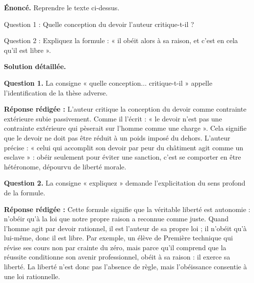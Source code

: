 \documentclass[11pt]{article}
\newcommand{\cle}[1]{{\popxbold\color{popdark}#1}}
\newcounter{popsec}
\newcounter{popsub}
\newcommand{\courssub}[1]{%
  \stepcounter{popsub}%
  \par\vspace{9pt}\noindent{\popxbold\fontsize{11.5}{13}\selectfont\color{popink}{\color{poporange}\thepopsec.\thepopsub}\hspace{6pt}#1}\par\nopagebreak\vspace{4pt}
}
\begin{document}
\begin{exoresolu}
\textbf{Énoncé.} Reprendre le texte ci-dessus.

Question 1 : Quelle conception du devoir l'auteur critique-t-il ?

Question 2 : Expliquez la formule : « il obéit alors à sa raison, et c'est en cela qu'il est libre ».

\tcblower
\textbf{Solution détaillée.}

\textbf{Question 1.} La consigne « quelle conception... critique-t-il » appelle l'identification de la thèse adverse.

\textbf{Réponse rédigée :} L'auteur critique la conception du devoir comme \cle{contrainte extérieure} subie passivement. Comme il l'écrit : « le devoir n'est pas une contrainte extérieure qui pèserait sur l'homme comme une charge ». Cela signifie que le devoir ne doit pas être réduit à un poids imposé du dehors. L'auteur précise : « celui qui accomplit son devoir par peur du châtiment agit comme un esclave » : obéir seulement pour éviter une sanction, c'est se comporter en être hétéronome, dépourvu de liberté morale.

\textbf{Question 2.} La consigne « expliquez » demande l'explicitation du sens profond de la formule.

\textbf{Réponse rédigée :} Cette formule signifie que la véritable liberté est \cle{autonomie} : n'obéir qu'à la loi que notre propre raison a reconnue comme juste. Quand l'homme agit par devoir rationnel, il est l'auteur de sa propre loi ; il n'obéit qu'à lui-même, donc il est libre. Par exemple, un élève de Première technique qui révise ses cours non par crainte du zéro, mais parce qu'il comprend que la réussite conditionne son avenir professionnel, obéit à sa raison : il exerce sa liberté. La liberté n'est donc pas l'absence de règle, mais l'obéissance consentie à une loi rationnelle.
\end{exoresolu}

\courssub{L'essai personnel}
\end{document}
